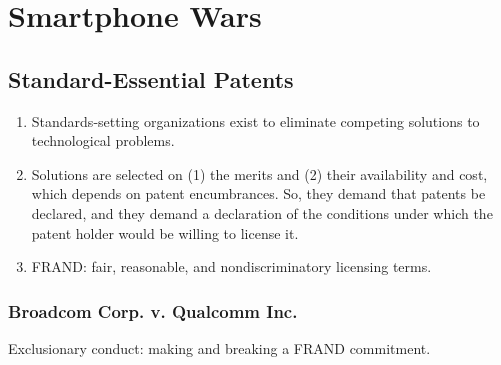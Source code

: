 \section{Smartphone Wars}

\subsection{Standard-Essential Patents}

\begin{enumerate}
    \item Standards-setting organizations exist to eliminate competing 
    solutions to technological problems.
    \item Solutions are selected on (1) the merits and (2) their availability 
    and cost, which depends on patent encumbrances. So, they demand that 
    patents be declared, and they demand a declaration of the conditions under 
    which the patent holder would be willing to license it.
    \item FRAND: fair, reasonable, and nondiscriminatory licensing terms.
\end{enumerate}


\subsubsection{Broadcom Corp. v. Qualcomm Inc.} %

Exclusionary conduct: making and breaking a FRAND commitment.


